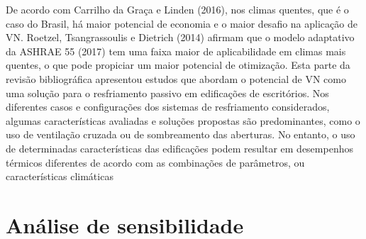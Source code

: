 \documentclass[brazil,hardcopy,openany,a5paper]{ufscthesis}
\begin{document}
	De acordo com Carrilho da Graça e Linden (2016), nos climas quentes, que é o caso do Brasil, há maior potencial de economia e o maior desafio na aplicação de VN. Roetzel, Tsangrassoulis e Dietrich (2014) afirmam que o modelo adaptativo da ASHRAE 55 (2017) tem uma faixa maior de aplicabilidade em climas mais quentes, o que pode propiciar um maior potencial de otimização.
	Esta parte da revisão bibliográfica apresentou estudos que abordam o potencial de VN como uma solução para o resfriamento passivo em edificações de escritórios. Nos diferentes casos e configurações dos sistemas de resfriamento considerados, algumas características avaliadas e soluções propostas são predominantes, como o uso de ventilação cruzada ou de sombreamento das aberturas. No entanto, o uso de determinadas características das edificações podem resultar em desempenhos térmicos diferentes de acordo com as combinações de parâmetros, ou características climáticas 
	
	\section{Análise de sensibilidade}
	
\end{document}
